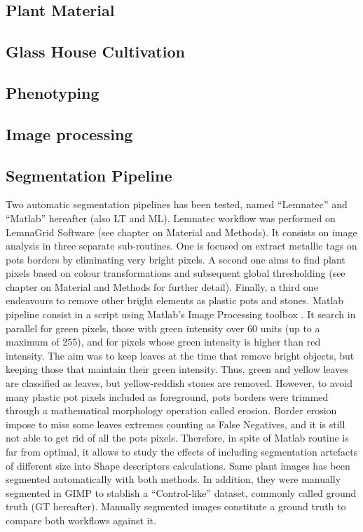 \documentclass{frontiersSCNS} %
\begin{document}
\subsection{Plant Material}


\subsection{Glass House Cultivation}




\subsection{Phenotyping}



\subsection{Image processing}

\subsection{Segmentation Pipeline}
Two automatic segmentation pipelines has been tested, named “Lemnatec” and “Matlab” hereafter (also LT and ML). Lemnatec workflow was performed on LemnaGrid Software (see chapter on Material and Methods). It consists on image analysis in three separate sub-routines. One is focused on extract metallic tags on pots borders by eliminating very bright pixels. A second one aims to find plant pixels based on colour transformations and subsequent global thresholding (see chapter on Material and Methods for further detail). Finally, a third one endeavours to remove other bright elements as plastic pots and stones.
Matlab pipeline consist in a script using Matlab’s Image Processing toolbox \cite{MATLAB:2010}. It search in parallel for green pixels, those with green intensity over 60 units (up to a maximum of 255), and for pixels whose green intensity is higher than red intensity. The aim was to keep leaves at the time that remove bright objects, but keeping those that maintain their green intensity. Thus, green and yellow leaves are classified as leaves, but yellow-reddish stones are removed. However, to avoid many plastic pot pixels included as foreground, pots borders were trimmed through a mathematical morphology operation called erosion. Border erosion impose to miss some leaves extremes counting as False Negatives, and it is still not able to get rid of all the pots pixels. Therefore, in spite of Matlab routine is far from optimal, it allows to study the effects of including segmentation artefacts of different size into Shape descriptors calculations.
Same plant images has been segmented automatically with both methods. In addition, they were manually segmented in GIMP to stablish a “Control-like” dataset, commonly called ground truth (GT hereafter). Manually segmented images constitute a ground truth to compare both workflows against it.
\end{document}
